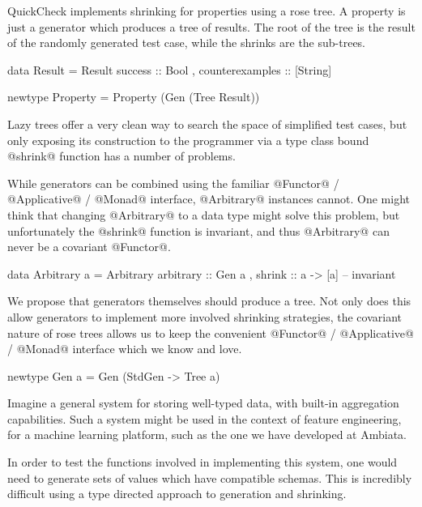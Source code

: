 QuickCheck implements shrinking for properties using a rose tree. A property is just a generator which produces a tree of results. The root of the tree is the result of the randomly generated test case, while the shrinks are the sub-trees.

\begin{code}
  data Result =
    Result {
        success         :: Bool
      , counterexamples :: [String]
      }

  newtype Property =
    Property (Gen (Tree Result))
\end{code}

Lazy trees offer a very clean way to search the space of simplified test cases, but only exposing its construction to the programmer via a type class bound @shrink@ function has a number of problems.

While generators can be combined using the familiar @Functor@ / @Applicative@ / @Monad@ interface, @Arbitrary@ instances cannot. One might think that changing @Arbitrary@ to a data type might solve this problem, but unfortunately the @shrink@ function is invariant, and thus @Arbitrary@ can never be a covariant @Functor@.

\begin{code}
  data Arbitrary a =
    Arbitrary {
        arbitrary :: Gen a
      , shrink    :: a -> [a] -- invariant
      }
\end{code}

We propose that generators themselves should produce a tree. Not only does this allow generators to implement more involved shrinking strategies, the covariant nature of rose trees allows us to keep the convenient @Functor@ / @Applicative@ / @Monad@ interface which we know and love.


\begin{code}
  newtype Gen a =
    Gen (StdGen -> Tree a)
\end{code}

Imagine a general system for storing well-typed data, with built-in aggregation capabilities. Such a system might be used in the context of feature engineering, for a machine learning platform, such as the one we have developed at Ambiata.

In order to test the functions involved in implementing this system, one would need to generate sets of values which have compatible schemas. This is incredibly difficult using a type directed approach to generation and shrinking.

